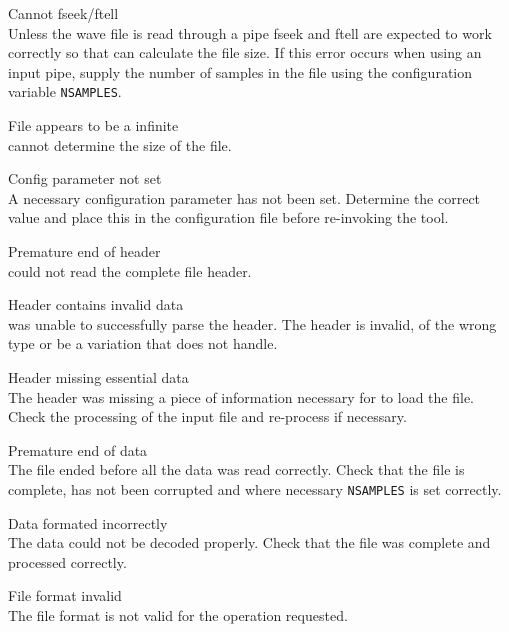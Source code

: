 \begin{itemize}

\begin{itemize}
    Cannot fseek/ftell\\
        Unless the wave file is read through a pipe fseek and ftell are 
        expected to work correctly so that  can calculate the 
        file size.  If this error occurs when using an input pipe, supply 
        the number of samples in the file using the configuration variable
        \texttt{NSAMPLES}.

    File appears to be a infinite\\
         cannot determine the size of the file.

    Config parameter not set\\
        A necessary configuration parameter has not been set.  Determine the 
        correct value and place this in the configuration file before 
        re-invoking the tool.

    Premature end of header\\
         could not read the complete file header.

    Header contains invalid data\\
         was unable to successfully parse the header.  The header
        is invalid, of the wrong type or be a variation that  does
        not handle.

    Header missing essential data\\
        The header was missing a piece of information necessary for 
         to load the file.  Check the processing of the 
        input file and re-process if necessary.

    Premature end of data\\
        The file ended before all the data was read correctly.  Check that the
        file is complete, has not been corrupted and where necessary 
        \texttt{NSAMPLES} is set correctly.

    Data formated incorrectly\\
        The data could not be decoded properly.  Check that the file was 
        complete and processed correctly.

    File format invalid\\
        The file format is not valid for the operation requested.


\end{itemize}
\end{itemize}
